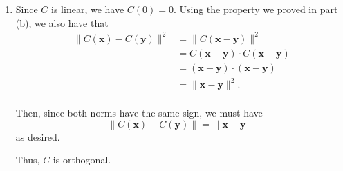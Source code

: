 \documentclass[12 pt, letterpaper]{hmcpset}
\begin{document}
\begin{solution}
\begin{enumerate}
\[\begin{split}
\begin{bmatrix}
						3
					\end{bmatrix} \\
								    & = 3 - 18 \\
								    & = -15.
				\end{split}
			\]
			and
			\[
				\begin{split}
					C(\mathbf{p}) \cdot C(\mathbf{q}) & = \frac{1}{9} \begin{bmatrix}
						2 \\
						19 \\
						-7
					\end{bmatrix} \cdot \begin{bmatrix}
						-5 \\
						-4 \\
						7
					\end{bmatrix} \\
									  & = \frac{-10 - 76 - 49}{9} \\
									  & = -\frac{135}{9} \\
									  & = - 15.
				\end{split}
			\]
			Thus, we have $C(\mathbf{p}) \cdot C(\mathbf{q}) = \mathbf{p} \cdot \mathbf{q}$.
		\item Since $C$ is linear, we have $C(0) = 0$. Using the property we proved in part (b), we also have that
			\[
				\begin{split}
					\lVert C(\mathbf{x}) - C(\mathbf{y}) \rVert^{2} & = \lVert C(\mathbf{x} - \mathbf{y}) \rVert^{2} \\
											& = C(\mathbf{x} - \mathbf{y}) \cdot C(\mathbf{x} - \mathbf{y}) \\
											& = (\mathbf{x} - \mathbf{y}) \cdot (\mathbf{x} - \mathbf{y}) \\
											& = \lVert \mathbf{x} - \mathbf{y} \rVert^{2}.
				\end{split}
			\] \\
			Then, since both norms have the same sign, we must have
			\[
				\lVert C(\mathbf{x}) - C(\mathbf{y}) \rVert = \lVert \mathbf{x} - \mathbf{y} \rVert
			\]
			as desired. 

			Thus, $C$ is orthogonal.
	\end{enumerate}
\end{solution}

\pagebreak
\end{document}
